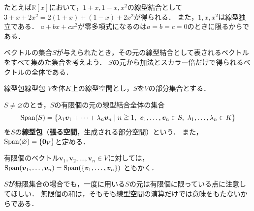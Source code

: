 たとえば$\mathbb{R}[x]$において，$1+x,1-x,x^2$の線型結合として$3+x+2x^2=2(1+x)+(1-x)+2x^2$が得られる．
また，$1,x,x^2$は線型独立である．
$a+bx+cx^2$が零多項式になるのは$a=b=c=0$のときに限るからである．

ベクトルの集合$S$が与えられたとき，その元の線型結合として表されるベクトルをすべて集めた集合を考えよう．
$S$の元から加法とスカラー倍だけで得られるベクトルの全体である．

\begin{definition}{線型包}{線型包}
  $V$を体$K$上の線型空間とし，$S$を$V$の部分集合とする．

  $S \neq \varnothing$のとき，$S$の有限個の元の線型結合全体の集合
  \[
    \Span(S)
    = \{ \lambda_1 \bm{v}_1 + \cdots + \lambda_n \bm{v}_n \mid n \ge 1,\ \bm{v}_1, \dots, \bm{v}_n \in S,\ \lambda_1, \dots, \lambda_n \in K \}
  \]
  を$S$の\textbf{線型包}（\textbf{張る空間}，生成される部分空間）という．
  また，$\operatorname{Span}(\varnothing) = \{\bm{0}_V\}$と定める．

  有限個のベクトル$\bm{v}_1, \bm{v}_2, \dots, \bm{v}_n \in V$に対しては，
  $\operatorname{Span}(\bm{v}_1, \dots, \bm{v}_n) = \operatorname{Span}(\{\bm{v}_1, \dots, \bm{v}_n\})$
  ともかく．
\end{definition}

$S$が無限集合の場合でも，一度に用いる$S$の元は有限個に限っている点に注意してほしい．
無限個の和は，そもそも線型空間の演算だけでは意味をもたないからである．

